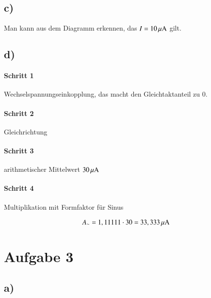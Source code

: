 \subsection*{c)}

Man kann aus dem Diagramm erkennen, das $I = \unit[10]{\mu A}$ gilt.


\subsection*{d)}

\paragraph{Schritt 1}

Wechselspannungseinkopplung, das macht den Gleichtaktanteil zu 0.

\paragraph{Schritt 2}

Gleichrichtung

\paragraph{Schritt 3}

arithmetischer Mittelwert $\unit[30]{\mu A}$

\paragraph{Schritt 4}

Multiplikation mit Formfaktor für Sinus

\begin{align*}
A_\sim = 1,11111 \cdot 30 = \unit[33,333]{\mu A}
\end{align*}


\section{Aufgabe 3}

\subsection*{a)}


